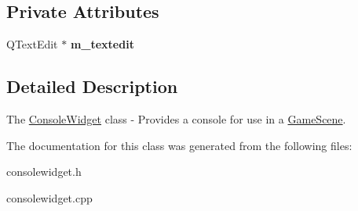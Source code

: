 \subsection*{Private Attributes}
\begin{DoxyCompactItemize}
\item 
\mbox{\label{class_console_widget_a8a1debe1a354c1d403b1deea7c25a0aa}} 
Q\+Text\+Edit $\ast$ {\bfseries m\+\_\+textedit}
\end{DoxyCompactItemize}


\subsection{Detailed Description}
The \hyperlink{class_console_widget}{Console\+Widget} class -\/ Provides a console for use in a \hyperlink{class_game_scene}{Game\+Scene}. 

The documentation for this class was generated from the following files\+:\begin{DoxyCompactItemize}
\item 
consolewidget.\+h\item 
consolewidget.\+cpp\end{DoxyCompactItemize}
